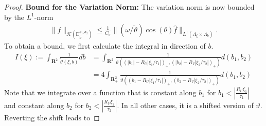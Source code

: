 \documentclass[a4paper]{article}
\newcommand{\rr}[1]{\mathbf{R}^{#1}}
\newcommand{\rrp}[1]{\mathbf{R}_+^{#1}}
\newcommand{\abs}[1]{| #1|}     %
\newcommand{\norm}[2]{\|#1\|_{#2}}
\numberwithin{equation}{section}
\theoremstyle{remark}
\begin{document}
\begin{proof}
    \textbf{Bound for the Variation Norm:}
    The variation norm is now bounded by the $L^1$-norm
    \begin{align*}
        \norm{f}{\mathcal{K}(\mathbb{D}_{\tilde{\sigma}}^{d_1,d_2})}
        \leq\frac{1}{C_\sigma}\norm{(\omega/\tilde{\vartheta})\cos(\theta)\hat{f}}{L^1(\Lambda_\xi\times\Lambda_b)}.
    \end{align*}
    To obtain a bound,
    we first calculate the integral in direction of $b$.
    \begin{align*}
        I(\xi):=\int_{\rr{2}}\frac{1}{\tilde{\vartheta}\left(\xi,b\right)}d b
        &=
        \int_{\rr{2}}\frac{1}{\vartheta
        \left(\left(\abs{b_1}-R_U\abs{\xi_1/\tau_1}\right)_+,
        \left(\abs{b_2}-R_V\abs{\xi_2/\tau_2}\right)_+\right)}d (b_1,b_2)
        \\
        &=4\int_{\rrp{2}}\frac{1}{\vartheta\left(\left(b_1-R_U\abs{\xi_1/\tau_1}\right)_+,\left(b_2-R_V\abs{\xi_2/\tau_2}\right)_+\right)}d (b_1,b_2)
    \end{align*}
    Note that we integrate over a function that is
    constant along $b_1$ for $b_1<\abs{\frac{R_U\xi_1}{\tau_1}}$
    and constant along $b_2$ for $b_2<\abs{\frac{R_V\xi_2}{\tau_2}}$.
    In all other cases, 
    it is a shifted version of $\vartheta$.
    Reverting the shift leads to


\end{proof}
\end{document}

